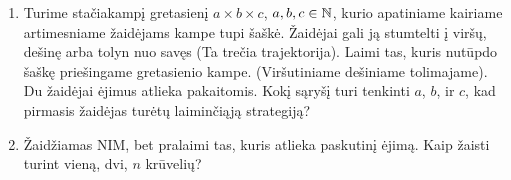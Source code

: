 \begin{enumerate}
  \item Turime stačiakampį gretasienį $a\times b\times c$, $a,b,c \in \mathbb N$,
    kurio apatiniame kairiame artimesniame žaidėjams kampe tupi šaškė.
    Žaidėjai gali ją stumtelti į viršų, dešinę arba tolyn nuo savęs (Ta
    trečia trajektorija). Laimi tas, kuris nutūpdo šaškę priešingame
    gretasienio kampe. (Viršutiniame dešiniame tolimajame). Du žaidėjai
    ėjimus atlieka pakaitomis. Kokį sąryšį turi tenkinti $a$, $b$, ir $c$,
    kad pirmasis žaidėjas turėtų laiminčiąją strategiją?

  \item {} Žaidžiamas NIM, bet pralaimi tas, kuris atlieka
    paskutinį ėjimą. Kaip žaisti turint vieną, dvi, $n$ krūvelių?
\end{enumerate}

